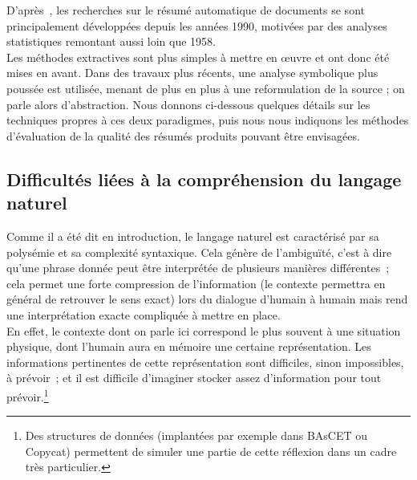 \documentclass[a4paper, 12pt]{article}
\begin{document}
D'après~\cite{jones_automatic_2007}, les recherches sur le résumé automatique de documents se sont principalement développées depuis les années 1990, motivées par des analyses statistiques remontant aussi loin que 1958.\\

Les méthodes extractives sont plus simples à mettre en \oe{}uvre et ont donc été mises en avant. Dans des travaux plus récents, une analyse symbolique plus poussée est utilisée, menant de plus en plus à une reformulation de la source ; on parle alors d'abstraction. Nous donnons ci-dessous quelques détails sur les techniques propres à ces deux paradigmes, puis nous nous indiquons les méthodes d'évaluation de la qualité des résumés produits pouvant être envisagées.

\subsection{Difficultés liées à la compréhension du langage naturel}

Comme il a été dit en introduction, le langage naturel est caractérisé par sa polysémie et sa complexité syntaxique. Cela génère de l'ambiguïté, c'est à dire qu'une phrase donnée peut être interprétée de plusieurs manières différentes~; cela permet une forte compression de l'information (le contexte permettra en général de retrouver le sens exact) lors du dialogue d'humain à humain mais rend une interprétation exacte compliquée à mettre en place.\\

En effet, le contexte dont on parle ici correspond le plus souvent à une situation physique, dont l'humain aura en mémoire une certaine représentation. Les informations pertinentes de cette représentation sont difficiles, sinon impossibles, à prévoir~; et il est difficile d'imaginer stocker assez d'information pour tout prévoir.\footnote{Des structures de données (implantées par exemple dans BAsCET ou Copycat) permettent de simuler une partie de cette réflexion dans un cadre très particulier.}\\
\end{document}
